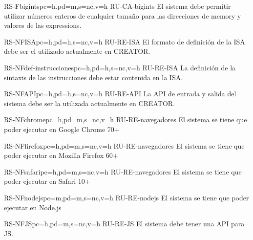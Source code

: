 \begin{softwareReq}{RS-F}{bigints}{pc=h,pd=m,s=nc,v=h}
    {RU-CA-bigints}
    El sistema debe permitir utilizar números enteros de cualquier tamaño para
    las direcciones de \gls{memory} y valores de las \glspl{expression}.
\end{softwareReq}


\begin{softwareReq}{RS-NF}{ISA}{pc=h,pd=h,s=nc,v=h}
    {RU-RE-ISA}
    El formato de definición de la \gls{ISA} debe ser el utilizado
    actualmente en CREATOR.
\end{softwareReq}

\begin{softwareReq}{RS-NF}{def-instrucciones}{pc=h,pd=h,s=nc,v=h}
    {RU-RE-ISA}
    La definición de la sintaxis de las instrucciones debe estar contenida en la
    \gls{ISA}.
\end{softwareReq}

\begin{softwareReq}{RS-NF}{API}{pc=h,pd=h,s=nc,v=h}
    {RU-RE-API}
    La \gls{API} de entrada y salida del sistema debe ser la utilizada
    actualmente en CREATOR.
\end{softwareReq}

\begin{softwareReq}{RS-NF}{chrome}{pc=h,pd=m,s=nc,v=h}
    {RU-RE-navegadores}
    El sistema se tiene que poder ejecutar en Google Chrome 70+
\end{softwareReq}

\begin{softwareReq}{RS-NF}{firefox}{pc=h,pd=m,s=nc,v=h}
    {RU-RE-navegadores}
    El sistema se tiene que poder ejecutar en Mozilla Firefox 60+
\end{softwareReq}

\begin{softwareReq}{RS-NF}{safari}{pc=h,pd=m,s=nc,v=h}
    {RU-RE-navegadores}
    El sistema se tiene que poder ejecutar en Safari 10+
\end{softwareReq}

\begin{softwareReq}{RS-NF}{nodejs}{pc=m,pd=m,s=nc,v=h}
    {RU-RE-nodejs}
    El sistema se tiene que poder ejecutar en Node.js
\end{softwareReq}

\begin{softwareReq}{RS-NF}{JS}{pc=h,pd=m,s=nc,v=h}
    {RU-RE-JS}
    El sistema debe tener una \gls{API} para \gls{JS}.
\end{softwareReq}

